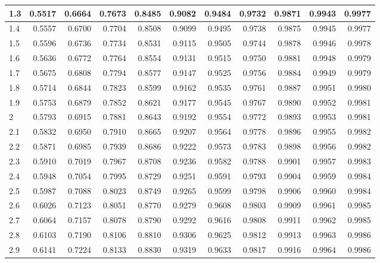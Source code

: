 \documentclass[
]{book}
\theoremstyle{definition}
\theoremstyle{definition}
\theoremstyle{definition}
\theoremstyle{definition}
\theoremstyle{remark}
\begin{document}
\begin{table}
\begin{tabular}[t]{l|r|r|r|r|r|r|r|r|r|r}
\hline
1.3 & 0.5517 & 0.6664 & 0.7673 & 0.8485 & 0.9082 & 0.9484 & 0.9732 & 0.9871 & 0.9943 & 0.9977\\
\hline
1.4 & 0.5557 & 0.6700 & 0.7704 & 0.8508 & 0.9099 & 0.9495 & 0.9738 & 0.9875 & 0.9945 & 0.9977\\
\hline
1.5 & 0.5596 & 0.6736 & 0.7734 & 0.8531 & 0.9115 & 0.9505 & 0.9744 & 0.9878 & 0.9946 & 0.9978\\
\hline
1.6 & 0.5636 & 0.6772 & 0.7764 & 0.8554 & 0.9131 & 0.9515 & 0.9750 & 0.9881 & 0.9948 & 0.9979\\
\hline
1.7 & 0.5675 & 0.6808 & 0.7794 & 0.8577 & 0.9147 & 0.9525 & 0.9756 & 0.9884 & 0.9949 & 0.9979\\
\hline
1.8 & 0.5714 & 0.6844 & 0.7823 & 0.8599 & 0.9162 & 0.9535 & 0.9761 & 0.9887 & 0.9951 & 0.9980\\
\hline
1.9 & 0.5753 & 0.6879 & 0.7852 & 0.8621 & 0.9177 & 0.9545 & 0.9767 & 0.9890 & 0.9952 & 0.9981\\
\hline
2 & 0.5793 & 0.6915 & 0.7881 & 0.8643 & 0.9192 & 0.9554 & 0.9772 & 0.9893 & 0.9953 & 0.9981\\
\hline
2.1 & 0.5832 & 0.6950 & 0.7910 & 0.8665 & 0.9207 & 0.9564 & 0.9778 & 0.9896 & 0.9955 & 0.9982\\
\hline
2.2 & 0.5871 & 0.6985 & 0.7939 & 0.8686 & 0.9222 & 0.9573 & 0.9783 & 0.9898 & 0.9956 & 0.9982\\
\hline
2.3 & 0.5910 & 0.7019 & 0.7967 & 0.8708 & 0.9236 & 0.9582 & 0.9788 & 0.9901 & 0.9957 & 0.9983\\
\hline
2.4 & 0.5948 & 0.7054 & 0.7995 & 0.8729 & 0.9251 & 0.9591 & 0.9793 & 0.9904 & 0.9959 & 0.9984\\
\hline
2.5 & 0.5987 & 0.7088 & 0.8023 & 0.8749 & 0.9265 & 0.9599 & 0.9798 & 0.9906 & 0.9960 & 0.9984\\
\hline
2.6 & 0.6026 & 0.7123 & 0.8051 & 0.8770 & 0.9279 & 0.9608 & 0.9803 & 0.9909 & 0.9961 & 0.9985\\
\hline
2.7 & 0.6064 & 0.7157 & 0.8078 & 0.8790 & 0.9292 & 0.9616 & 0.9808 & 0.9911 & 0.9962 & 0.9985\\
\hline
2.8 & 0.6103 & 0.7190 & 0.8106 & 0.8810 & 0.9306 & 0.9625 & 0.9812 & 0.9913 & 0.9963 & 0.9986\\
\hline
2.9 & 0.6141 & 0.7224 & 0.8133 & 0.8830 & 0.9319 & 0.9633 & 0.9817 & 0.9916 & 0.9964 & 0.9986\\
\hline
\end{tabular}
\end{table}
\end{document}
